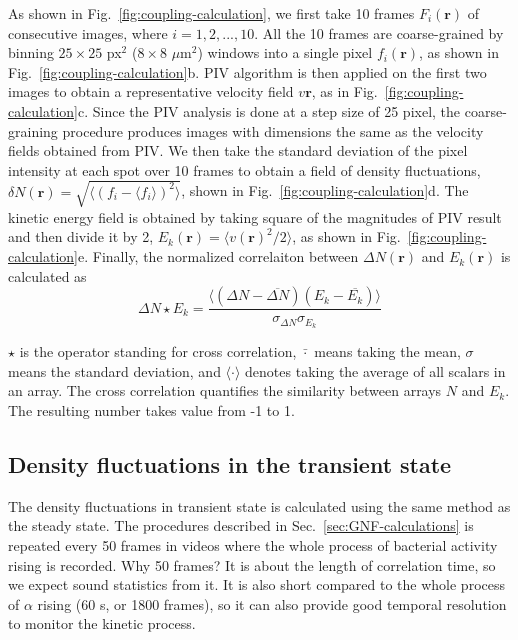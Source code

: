 \documentclass[twocolumn,aps,prx,amsmath,amssymb,longbibliography]{revtex4-2}
\begin{document}
As shown in Fig.~\ref{fig:coupling-calculation}, we first take 10 frames $F_i(\bm{r})$ of consecutive images, where $i=1, 2, ..., 10$. All the 10 frames are coarse-grained by binning $25\times 25$ px$^2$ ($8\times8$ $\mu$m$^2$) windows into a single pixel $f_i(\bm{r})$, as shown in Fig.~\ref{fig:coupling-calculation}b. PIV algorithm is then applied on the first two images to obtain a representative velocity field $v{\bm{r}}$, as in Fig.~\ref{fig:coupling-calculation}c. Since the PIV analysis is done at a step size of 25 pixel, the coarse-graining procedure produces images with dimensions the same as the velocity fields obtained from PIV. We then take the standard deviation of the pixel intensity at each spot over 10 frames to obtain a field of density fluctuations, $\delta N(\bm{r}) = \sqrt{\langle(f_i-\langle f_i\rangle)^2\rangle}$, shown in Fig.~\ref{fig:coupling-calculation}d. The kinetic energy field is obtained by taking square of the magnitudes of PIV result and then divide it by 2, $E_k(\bm{r})=\langle v(\bm{r})^2 / 2 \rangle$, as shown in Fig.~\ref{fig:coupling-calculation}e. Finally, the normalized correlaiton between $\Delta N(\bm{r})$ and $E_k(\bm{r})$ is calculated as
\begin{equation}
  \Delta N\star E_k = \frac{\langle(\Delta N-\overline{\Delta N})(E_k-\overline{E_k})\rangle}{\sigma_{\Delta N}\sigma_{E_k}}
\end{equation}

$\star$ is the operator standing for cross correlation, $\bar\cdot$ means taking the mean, $\sigma$ means the standard deviation, and $\langle\cdot\rangle$ denotes taking the average of all scalars in an array. The cross correlation quantifies the similarity between arrays $N$ and $E_k$. The resulting number takes value from -1 to 1.

\subsection{Density fluctuations in the transient state}

The density fluctuations in transient state is calculated using the same method as the steady state. The procedures described in Sec.~\ref{sec:GNF-calculations} is repeated every 50 frames in videos where the whole process of bacterial activity rising is recorded. Why 50 frames? It is about the length of correlation time, so we expect sound statistics from it. It is also short compared to the whole process of $\alpha$ rising (60 s, or 1800 frames), so it can also provide good temporal resolution to monitor the kinetic process.
\end{document}
